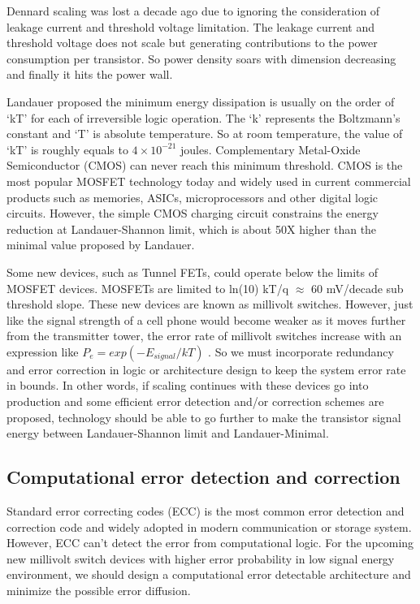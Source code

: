 \documentclass{sig-alternate}
\begin{document}
Dennard scaling was lost a decade ago due to ignoring the consideration of leakage current and threshold voltage limitation. The leakage current and threshold voltage does not scale but generating contributions to the power consumption per transistor. So power density soars with dimension decreasing and finally it hits the power wall.

Landauer\cite{Landauer_mini} proposed the minimum energy dissipation is usually on the order of `kT' for each of irreversible logic operation. The `k' represents the Boltzmann's constant and `T' is absolute temperature. So at room temperature, the value of `kT' is roughly equals to $4\times10^{-21}$ joules. Complementary Metal-Oxide Semiconductor (CMOS) can never reach this minimum threshold.  
CMOS is the most popular MOSFET technology today and widely used in current commercial products such as memories, ASICs, microprocessors and other digital logic circuits. However, the simple CMOS charging circuit constrains the energy reduction at Landauer-Shannon limit\cite{Landauer-Shannon}, which is about 50X higher than the minimal value proposed by Landauer.

Some new devices, such as Tunnel FETs\cite{TFET}, could operate below the limits of MOSFET devices. MOSFETs are limited to ln(10) kT/q $\approx$ 60 mV/decade sub threshold slope. These new devices are known as millivolt switches. However, just like the signal strength of a cell phone would become weaker as it moves further from the transmitter tower, the error rate of millivolt switches increase with an expression like $P_{e} = exp(-E_{signal} / kT)$ \cite{Agarwal}. So we must incorporate redundancy and error correction in logic or architecture design to keep the system error rate in bounds. In other words, if scaling continues with these devices go into production and some efficient error detection and/or correction schemes are proposed, technology should be able to go further to make the transistor signal energy between Landauer-Shannon limit and Landauer-Minimal. 

\subsection{Computational error detection and correction}
Standard error correcting codes (ECC)\cite{macwilliams1977theory}  is the most common error detection and correction code and widely adopted in modern communication or storage system. However, ECC can't detect the error from computational logic. For the upcoming new millivolt switch devices with higher error probability in low signal energy environment, we should design a computational error detectable architecture and minimize the possible error diffusion.
\end{document}
